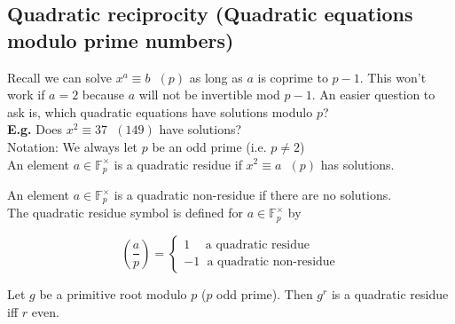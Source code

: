 \documentclass[11pt]{article}
\begin{document}
\subsection{Quadratic reciprocity (Quadratic equations modulo prime numbers)}
Recall we can solve $x^a \equiv b\hspace{7pt} (p)$ as long as $a$ is coprime to $p-1$. This won't work if $a=2$ because $a$ will not be invertible mod $p-1$. An easier question to ask is, which quadratic equations have solutions modulo $p$?\\
\textbf{E.g.} Does $x^2 \equiv 37 \hspace{7pt} (149)$ have solutions?\\[1em]

Notation: We always let $p$ be an odd prime (i.e. $p\neq 2$)\\[0.5em]

An element $a \in \mathbb{F}^\times_p $ is a quadratic residue if $x^2 \equiv a \hspace{7pt} (p)$ has solutions.

An element $a \in \mathbb{F}^\times_p $ is a quadratic non-residue if there are no solutions. \\[1em]
The quadratic residue symbol is defined for $a \in \mathbb{F}^\times_p$ by

\begin{equation*}
(\frac{a}{p}) =
\begin{cases}
		1 \hspace{11pt} \text{ a quadratic residue}\\
		-1 \hspace{7pt} \text{a quadratic non-residue}
\end{cases}
\end{equation*}

\begin{lemma}
	Let $g$ be a primitive root modulo $p$ ($p$ odd prime). Then $g^r$ is a quadratic residue iff $r$ even.
\end{lemma}
\end{document}
